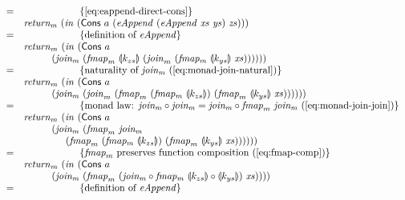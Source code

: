 \documentclass{jfp1}
\newcommand{\fold}[1]{\llparenthesis #1 \rrparenthesis}
\newcommand{\eqAnnotation}[1]{\hspace{2cm}\left\{\textrm{#1}\right\}}
\begin{document}
\begin{proof*}
\begin{displaymath}
\begin{array}{cl}
      =&\eqAnnotation{\autoref{eq:eappend-direct-cons}} \\
      & \mathit{return_m}~(\mathit{in}~(\mathsf{Cons}~a~(\mathit{eAppend}~(\mathit{eAppend}~\mathit{xs}~\mathit{ys})~\mathit{zs}))) \\
      =&\eqAnnotation{definition of $\mathit{eAppend}$} \\
      &\mathit{return}_m~(\mathit{in}~(\mathsf{Cons}~a~\\
      & \hspace{1cm}(\mathit{join_m}~(\mathit{fmap}_m~\fold{k_{zs}}~(\mathit{join}_m~(\mathit{fmap_m}~\fold{k_{ys}}~\mathit{xs})))))) \\
      =&\eqAnnotation{naturality of $\mathit{join_m}$ (\autoref{eq:monad-join-natural})} \\
      &\mathit{return}_m~(\mathit{in}~(\mathsf{Cons}~a~\\
      & \hspace{1cm}(\mathit{join_m}~(\mathit{join}_m~(\mathit{fmap}_m~(\mathit{fmap_m}~\fold{k_{zs}})~(\mathit{fmap}_m~\fold{k_{ys}}~\mathit{xs})))))) \\
      =&\eqAnnotation{monad law: $\mathit{join_m} \circ \mathit{join_m} = \mathit{join_m} \circ \mathit{fmap}_m~\mathit{join_m}$ (\autoref{eq:monad-join-join})} \\
      &\mathit{return}_m~(\mathit{in}~(\mathsf{Cons}~a~\\
      & \hspace{1cm}(\mathit{join_m}~(\mathit{fmap}_m~\mathit{join_m}~\\
      & \hspace{1.5cm}(\mathit{fmap}_m~(\mathit{fmap_m}~\fold{k_{zs}})~(\mathit{fmap}_m~\fold{k_{ys}}~\mathit{xs})))))) \\
      =&\eqAnnotation{$\mathit{fmap}_m$ preserves function composition (\autoref{eq:fmap-comp})} \\
      & \mathit{return}_m~(\mathit{in}~(\mathsf{Cons}~a~\\
      & \hspace{1cm}(\mathit{join_m}~(\mathit{fmap}_m~(\mathit{join_m} \circ \mathit{fmap_m}~\fold{k_{zs}} \circ \fold{k_{ys}})~\mathit{xs})))) \\
      =&\eqAnnotation{definition of $\mathit{eAppend}$} \\

\end{array}
\end{displaymath}
\end{proof*}
\end{document}
